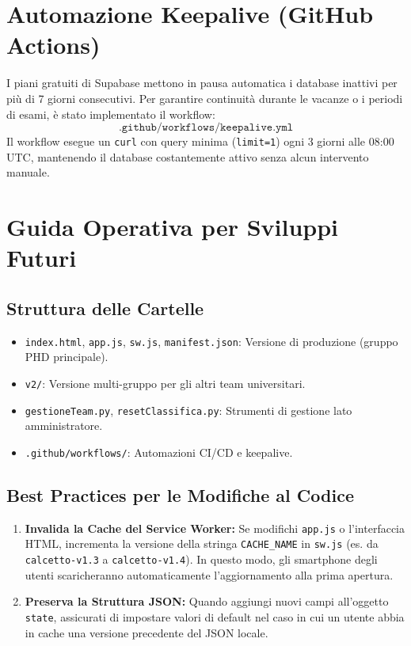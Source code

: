 \documentclass[11pt,a4paper]{article}
\begin{document}
\section{Automazione Keepalive (GitHub Actions)}
I piani gratuiti di Supabase mettono in pausa automatica i database inattivi per pi\`u di 7 giorni consecutivi. Per garantire continuit\`a durante le vacanze o i periodi di esami, \`e stato implementato il workflow:
\[ \texttt{.github/workflows/keepalive.yml} \]
Il workflow esegue un \texttt{curl} con query minima (\texttt{limit=1}) ogni 3 giorni alle 08:00 UTC, mantenendo il database costantemente attivo senza alcun intervento manuale.

\section{Guida Operativa per Sviluppi Futuri}

\subsection{Struttura delle Cartelle}
\begin{itemize}
    \item \texttt{index.html}, \texttt{app.js}, \texttt{sw.js}, \texttt{manifest.json}: Versione di produzione (gruppo PHD principale).
    \item \texttt{v2/}: Versione multi-gruppo per gli altri team universitari.
    \item \texttt{gestioneTeam.py}, \texttt{resetClassifica.py}: Strumenti di gestione lato amministratore.
    \item \texttt{.github/workflows/}: Automazioni CI/CD e keepalive.
\end{itemize}

\subsection{Best Practices per le Modifiche al Codice}
\begin{enumerate}
    \item \textbf{Invalida la Cache del Service Worker:} Se modifichi \texttt{app.js} o l'interfaccia HTML, incrementa la versione della stringa \texttt{CACHE\_NAME} in \texttt{sw.js} (es. da \texttt{calcetto-v1.3} a \texttt{calcetto-v1.4}). In questo modo, gli smartphone degli utenti scaricheranno automaticamente l'aggiornamento alla prima apertura.
    \item \textbf{Preserva la Struttura JSON:} Quando aggiungi nuovi campi all'oggetto \texttt{state}, assicurati di impostare valori di default nel caso in cui un utente abbia in cache una versione precedente del JSON locale.
\end{enumerate}
\end{document}
